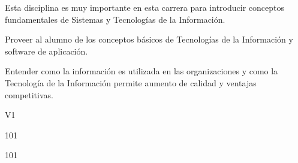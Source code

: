 \begin{syllabus}


\begin{justification}
Esta disciplina es muy importante en esta carrera para introducir conceptos fundamentales de Sistemas y Tecnologías de la Información.
\end{justification}

\begin{goals}
\item Proveer al alumno de los conceptos básicos de Tecnologías de la Información y software de aplicación.
\item Entender como la información es utilizada en las organizaciones y como la Tecnología de la Información permite aumento de calidad y ventajas competitivas.
\end{goals}

\begin{outcomes}{V1}
   \item {}
   \item {}
   \item {}
   \item {}
   \item {}
   \item {}
   \item {}
   \item {}
\end{outcomes}

\begin{unit}{\LUFIVEDef}{}{\LUFIVEBib}{10}{1}
   \begin{topics}
      \item \OMCTWOTopicTWOxTWOxONEOH
      \item \TDSONETopicTHREExONExONE
      \item \TDSONETopicTHREExONExTWO
      \item \TDSONETopicTHREExONExTHREE
      \item \TDSONETopicTHREExONExFOUR
      \item \TDSONETopicTHREExONExFIVE
   \end{topics}
	\LUFIVEGoal
\end{unit}

\begin{unit}{\LUSIXDef}{}{\LUSIXBib}{10}{1}
   \begin{topics}
      \item \OMCTHREETopicTWOxTHREExONE
      \item \OMCTHREETopicTWOxTHREExTWO
      \item \OMCTHREETopicTWOxTHREExTHREE
   \end{topics}
	\LUSIXGoal
\end{unit}


\end{syllabus}
